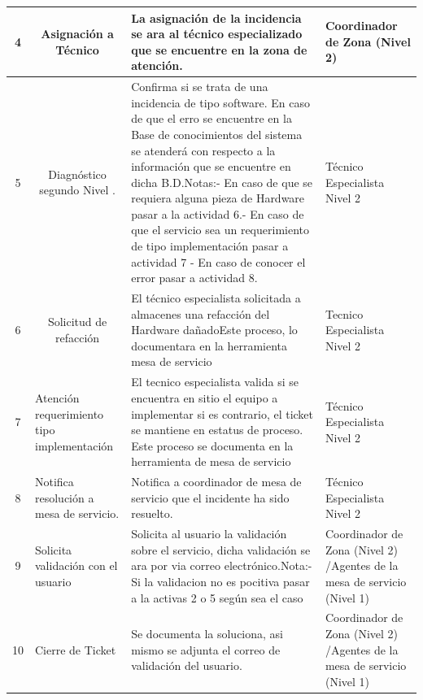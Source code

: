 \begin{table}[H]
{\begin{tabular}{|c|p{12.855em}|p{42.43em}|p{7.645em}|}
			\midrule
			4 & \multicolumn{1}{c|}{Asignación a Técnico } & La asignación de la incidencia se ara al técnico especializado que se encuentre en la zona de atención.  & Coordinador de Zona (Nivel 2) \\
			\midrule
			5 & \multicolumn{1}{c|}{Diagnóstico segundo Nivel .} & Confirma si se trata de una incidencia de tipo software. \newline{}En caso de que el erro se encuentre en la Base de conocimientos del sistema \newline{}se atenderá con respecto a la información que se encuentre en dicha B.D.\newline{}\newline{}\newline{}Notas:\newline{}\newline{}- 	En caso de que se requiera alguna pieza de Hardware pasar a la actividad 6.\newline{}-             En caso de que el servicio sea un requerimiento de tipo implementación pasar a actividad 7 \newline{}-	En caso de conocer el error pasar a actividad 8. &  Técnico Especialista Nivel 2 \\
			\midrule
			6 & \multicolumn{1}{c|}{Solicitud de refacción } & El técnico especialista  solicitada a almacenes una refacción del Hardware dañado\newline{}Este proceso, lo documentara en la herramienta mesa de servicio  &  Tecnico Especialista Nivel 2 \\
			\midrule
			7 & Atención requerimiento tipo implementación  & El tecnico especialista valida si se encuentra en sitio el equipo a implementar si es contrario, el ticket se mantiene en estatus de proceso. \newline{}\newline{}Este proceso se documenta en la herramienta de mesa de servicio &  Técnico Especialista Nivel 2 \\
			\midrule
			8 & Notifica resolución a mesa de servicio. & Notifica a coordinador de mesa de servicio que el incidente ha sido resuelto. &  Técnico Especialista Nivel 2 \\
			\midrule
			9 & Solicita validación con el usuario & Solicita al usuario la validación sobre el servicio, dicha validación se ara por via correo electrónico.\newline{}\newline{}Nota:\newline{}- Si la validacion no es pocitiva pasar a la activas 2 o 5 según sea el caso  & Coordinador de Zona (Nivel 2) /\newline{}Agentes de la mesa de servicio (Nivel 1) \\
			\midrule
			10 & Cierre de Ticket  & Se documenta la soluciona, asi mismo se adjunta el correo de validación del usuario. & Coordinador de Zona (Nivel 2) /\newline{}Agentes de la mesa de servicio (Nivel 1) \\
			\bottomrule
		\end{tabular}%
		\label{tab:FDTGDI}}%
\end{table}%


